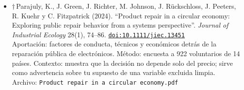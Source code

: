 \documentclass[11pt]{article}
\begin{document}
\begin{itemize}
{\footnotesize Archivo: \texttt{Business Outcomes of Product Repairability.pdf}}
\item $\dagger$\,Parajuly, K., J. Green, J. Richter, M. Johnson, J. Rückschloss, J. Peeters, R. Kuehr y C. Fitzpatrick (2024). ``Product repair in a circular economy: Exploring public repair behavior from a systems perspective''. \textit{Journal of Industrial Ecology} 28(1), 74--86. \href{https://doi.org/10.1111/jiec.13451}{\texttt{doi:10.1111/jiec.13451}}\\
Aportación: factores de conducta, técnicos y económicos detrás de la reparación pública de electrónicos. Método: encuesta a 922 voluntarios de 14 países. Contexto: muestra que la decisión no depende solo del precio; sirve como advertencia sobre tu supuesto de una variable excluida limpia.\\
{\footnotesize Archivo: \texttt{Product repair in a circular economy.pdf}}
\end{itemize}
\end{document}
